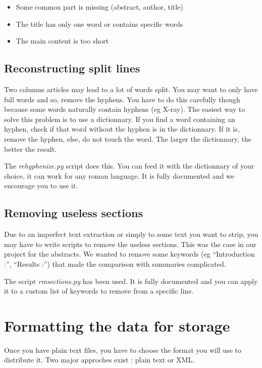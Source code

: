 \documentclass[a4paper,10pt]{article}
\begin{document}
\begin{itemize}
\item Some common part is missing (abstract, author, title)
\item The title has only one word or contains specific words
\item The main content is too short
\end{itemize}

\subsection{Reconstructing split lines}
\label{sec:splittedlines}

Two columns articles may lead to a lot of words split. You may want to
only have full words and so, remove the hyphens. You have to do this
carefully though because some words naturally contain hyphens (eg
X-ray). The easiest way to solve this problem is to use a
dictionnary. If you find a word containing an hyphen, check if that
word without the hyphen is in the dictionnary. If it is, remove the
hyphen, else, do not touch the word. The larger the dictionnary, the
better the result.

The \emph{rehyphenize.py} script does this. You can feed it with the
dictionnary of your choice, it can work for any roman language. It is
fully documented and we encourage you to use it.


\subsection{Removing useless sections}
\label{sec:removesec}

Due to an imperfect text extraction or simply to some text you want to
strip, you may have to write scripts to remove the useless
sections. This was the case in our project for the abstracts. We
wanted to remove some keywords (eg ``Introduction :'', ``Results :'')
that made the comparison with summaries complicated.

The script \emph{rmsections.py} has been used. It is fully documented
and you can apply it to a custom list of keywords to remove from a
specific line.


\section{Formatting the data for storage}
\label{sec:format}

Once you have plain text files, you have to choose the format you will
use to distribute it. Two major approches exist : plain text or XML.
\end{document}
